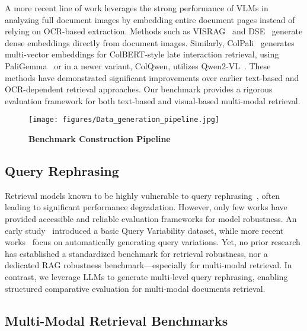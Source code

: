 \vspace{0.1cm}
\noindent
A more recent line of work leverages the strong performance of VLMs in analyzing full document images by embedding entire document pages instead of relying on OCR-based extraction. 
Methods such as VISRAG~\citep{yu2024visrag} and DSE~\citep{ma2024unifying} generate dense embeddings directly from document images. Similarly, ColPali~\citep{faysse2024colpali} generates multi-vector embeddings for ColBERT-style late interaction retrieval, using PaliGemma~\citep{beyer2024paligemma} or in a newer variant, ColQwen, utilizes Qwen2-VL~\citep{Qwen2VL}.
These methods have demonstrated significant improvements over earlier text-based and OCR-dependent retrieval approaches. Our benchmark provides a rigorous evaluation framework for both text-based and visual-based multi-modal retrieval.

\begin{figure*}[t]
    \centering
    \texttt{[image: figures/Data\_generation\_pipeline.jpg]} %
    \caption{\textbf{Benchmark Construction Pipeline}}
    \label{fig:Data_generation_pipeline} 
\end{figure*}

\subsection{Query Rephrasing}

Retrieval models known to be highly vulnerable to query rephrasing~\citep{zuccon2016query,bailey2017retrieval,sidiropoulos2022analysing,penha2022evaluating,hagen2024revisiting}, often leading to significant performance degradation. However, only few works have provided accessible and reliable evaluation frameworks for model robustness. An early study~\citep{bailey2016uqv100} introduced a basic Query Variability dataset, while more recent works~\citep{benham2018towards,lu2019relevance,penha2022evaluating} focus on automatically generating query variations. Yet, no prior research has established a standardized benchmark for retrieval robustness, nor a dedicated RAG robustness benchmark—especially for multi-modal retrieval. In contrast, we leverage LLMs to generate multi-level query rephrasing, enabling structured comparative evaluation for multi-modal documents retrieval.


\subsection{Multi-Modal Retrieval Benchmarks}

